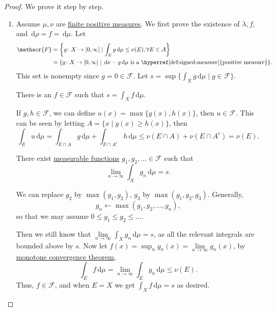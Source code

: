 \begin{proof}
	We prove it step by step.
	\begin{enumerate}[(1)]
		\item Assume \(\mu, \nu\) are \hyperref[def:finite-signed-measure]{finite positive measures}. We first prove the existence of \(\lambda , f\),
		      and \(\,\mathrm{d} \rho = f = \,\mathrm{d} \mu \). Let
		      \[
			      \begin{split}
				      \mathscr{F} & = \left\{g \colon X \to [0,\infty] \mid \int_E g \,\mathrm{d} \mu \leq \nu(E), \forall E \in \mathcal{A}\right\} \\
				      & = \{g \colon X \to [0,\infty] \mid \,\mathrm{d} \nu - g\,\mathrm{d} \mu \text{ is a \hyperref[def:signed-measure]{positive measure}}\}.
			      \end{split}
		      \]
		      This set is nonempty since \(g = 0 \in \mathscr{F}\). Let \(s = \sup\{\int_X g \,\mathrm{d} \mu \mid g \in \mathscr{F}\}\).

		      \begin{claim}
			      There is an \(f \in \mathscr{F}\) such that \(s = \int_X f \,\mathrm{d} \mu\).
		      \end{claim}
		      \begin{explanation}
			      If \(g, h \in \mathscr{F}\), we can define \(u(x) = \max\{g(x),h(x)\}\), then \(u \in \mathscr{F}\). This can be seen by letting
			      \(A = \{x \mid g(x) \geq h(x)\}\), then
			      \[
				      \int_E u \,\mathrm{d} \mu = \int_{E \cap A} g \,\mathrm{d} \mu + \int_{E \cap A^c} h \,\mathrm{d} \mu
				      \leq \nu(E \cap A) + \nu(E \cap A^c) = \nu(E).
			      \]

			      There exist \hyperref[def:measurable-function]{measurable functions} \(g_1,g_2,\ldots \in \mathscr{F}\) such that
			      \[
				      \lim_{n \to \infty} \int_X g_n \,\mathrm{d} \mu = s.
			      \]

			      We can replace \(g_2\) by \(\max(g_1,g_2)\), \(g_3\) by \(\max(g_1,g_2,g_3)\). Generally,
			      \[
				      g_{n} \gets \mathop{\max} (g_1, g_2, \ldots , g_n),
			      \]
			      so that we may assume \(0 \leq g_1 \leq g_2 \leq \ldots\).

			      Then we still know that \(\lim\limits_{n \to \infty} \int_X g_n \,\mathrm{d} \mu = s\), as all the relevant integrals are bounded above by \(s\).
			      Now let \(f(x) = \sup_n g_n(x) = \lim\limits_{n \to \infty} g_n(x)\), by \hyperref[thm:MCT]{monotone convergence theorem},
			      \[
				      \int_E f \,\mathrm{d} \mu = \lim_{n \to \infty} \int_E g_n \,\mathrm{d} \mu \leq \nu(E).
			      \]
			      Thus, \(f \in \mathscr{F}\), and when \(E = X\) we get \(\int_X f \,\mathrm{d} \mu = s\) as desired.
		      \end{explanation}


\end{enumerate}
\end{proof}

